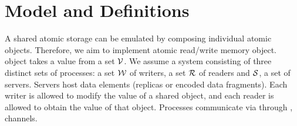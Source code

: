 \section{Model and Definitions}\label{model}
A shared atomic storage can be emulated
by composing individual atomic objects. Therefore, we aim
to implement  atomic read/write memory object. %
 object takes a value from a set ${\mathcal V}$. 
We assume a system consisting of three distinct sets of processes: 
a set $\mathcal{W}$ of writers, a set $\mathcal{R}$ of readers and  $\mathcal{S}$, a set of servers. 
 Servers host data elements (replicas or encoded data fragments).
Each writer is allowed to modify the value of a shared object, and each reader is allowed to obtain 
the value of that object. 
Processes communicate via  through 
,  channels. 
%



%

